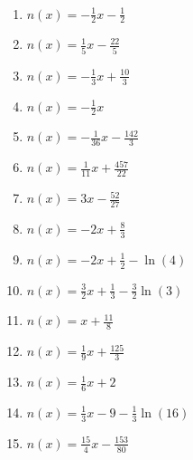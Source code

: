 \begin{Answer}[ref=normaleBestimmenA1]\\
	\begin{enumerate}[label=\alph*)]
		\item \(n(x)=-\frac{1}{2}x-\frac{1}{2}\)
		\item \(n(x)=\frac{1}{5}x-\frac{22}{5}\)
		\item \(n(x)=-\frac{1}{3}x+\frac{10}{3}\)
		\item \(n(x)=-\frac{1}{2}x\)
		\item \(n(x)=-\frac{1}{36}x-\frac{142}{3}\)
		\item \(n(x)=\frac{1}{11}x+\frac{457}{22}\)
		\item \(n(x)=3x-\frac{52}{27}\)
		\item \(n(x)=-2x+\frac{8}{3}\)
		\item \(n(x)=-2x+\frac{1}{2}-\ln(4)\)
		\item \(n(x)=\frac{3}{2}x+\frac{1}{3}-\frac{3}{2}\ln(3)\)
		\item \(n(x)=x+\frac{11}{8}\)
		\item \(n(x)=\frac{1}{9}x+\frac{125}{3}\)
		\item \(n(x)=\frac{1}{6}x+2\)
		\item \(n(x)=\frac{1}{3}x-9-\frac{1}{3}\ln(16)\)
		\item \(n(x)=\frac{15}{4}x-\frac{153}{80}\)
	\end{enumerate}
\end{Answer}